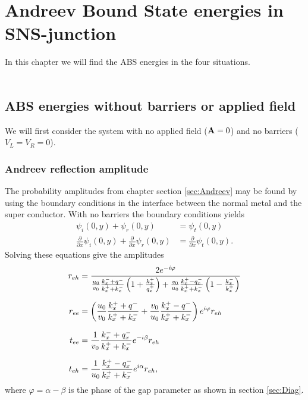 \chapter{Andreev Bound State energies in SNS-junction}
In this chapter we will find the ABS energies in the four situations.
\\
\\
\section{ABS energies without barriers or applied field}
\label{sec:without}
We will first consider the system with no applied field ($\mathbf{A}=0$) and no barriers ($V_L = V_R = 0$). 

\subsection{Andreev reflection amplitude}
The probability amplitudes from chapter section \ref{sec:Andreev} may be found by using the boundary conditions in the interface between the normal metal and the super conductor. With no barriers the boundary conditions yields
\begin{equation}
\begin{split}
\psi_i(0,y) + \psi_r(0,y) &= \psi_t(0,y)\\
\frac{\partial}{\partial x}\psi_i(0,y) + \frac{\partial}{\partial x}\psi_r(0,y) &= \frac{\partial}{\partial x}\psi_t(0,y).
\end{split}
\end{equation}
Solving these equations give the amplitudes 
\begin{equation}
\setlength{\jot}{10pt}
\begin{split}
    r_{eh} &= \frac{2e^{-i\varphi}}{\frac{u_0}{v_0}\frac{k_x^-+q^-}{k_x^++k_x^-}\left(1+\frac{k_x^+}{q_x^+}\right)+\frac{v_0}{u_0}\frac{k_x^+-q_x^-}{k_x^++k_x^-}\left(1-\frac{k_x^-}{k_x^+}\right)}\\
    r_{ee} &= \left(\frac{u_0}{v_0}\frac{k_x^++q^-}{k_x^++k_x^-}+\frac{v_0}{u_0}\frac{k_x^+-q^-}{k_x^++k_x^-}\right)e^{i\varphi}r_{eh}\\
    t_{ee} &= \frac{1}{v_0}\frac{k_x^-+q_x^-}{k_x^++k_x^-}e^{-i\beta}r_{eh}\\
    t_{eh} &= \frac{1}{u_0}\frac{k_x^+-q_x^-}{k_x^++k_x^-}e^{i\alpha}r_{eh},
\end{split}
\end{equation}
where $\varphi = \alpha - \beta$ is the phase of the gap parameter as shown in section \ref{sec:Diag}.
